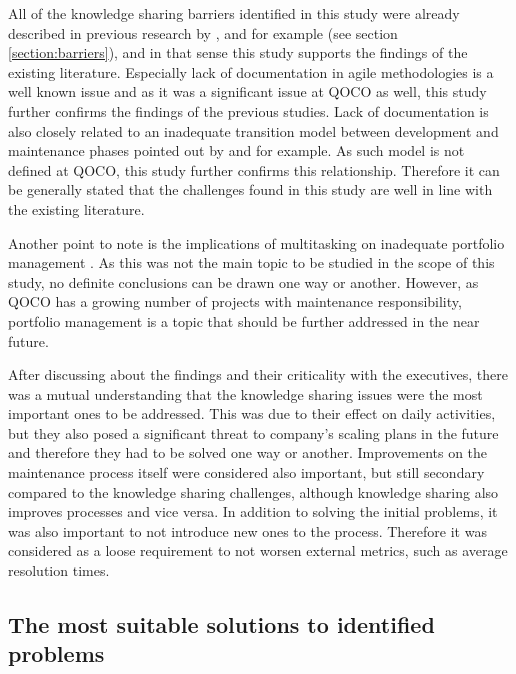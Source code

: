 All of the knowledge sharing barriers identified in this study were already described in previous research by \citet{Ghobadi2016}, \citet{Dalkir2013} and \citet{Riege2005}
for example (see section \ref{section:barriers}), and in that sense this study
supports the findings of the existing literature. Especially lack of documentation in agile methodologies is a well known issue \citep{Ito2016}\citep{Sommerville2011}\citep{Stettina2013}
and as it was a significant issue at QOCO as well, this study further confirms the findings of the previous studies.
Lack of documentation is also closely related to an inadequate transition model between development
and maintenance phases pointed out by \citet{Ito2016} and \citet{Stettina2013} for example. As such model is not defined at QOCO, this study further confirms this relationship. Therefore it can be generally stated
that the challenges found in this study are well in line with the existing literature.

Another point to note is the implications of multitasking on inadequate portfolio management \citep{Vahaniitty2010}. As this was not the main topic to be studied in the scope of this
study, no definite conclusions can be drawn one way or another. However, as QOCO has a growing number of projects with maintenance responsibility, portfolio management
is a topic that should be further addressed in the near future.

After discussing about the findings and their criticality with the executives, there was a mutual understanding that the knowledge sharing issues were the most important ones to be addressed. This was due to
their effect on daily activities, but they also posed a significant threat to company's scaling plans in the future and therefore they had to be solved one way or another. Improvements on the maintenance process
itself were considered also important, but still secondary compared to the knowledge sharing challenges, although knowledge sharing also improves processes and vice versa. In addition to solving the
initial problems, it was also important to not introduce new ones to the process. Therefore it was considered as a loose requirement to not worsen external metrics, such as average resolution times.

\subsection{The most suitable solutions to identified problems}

